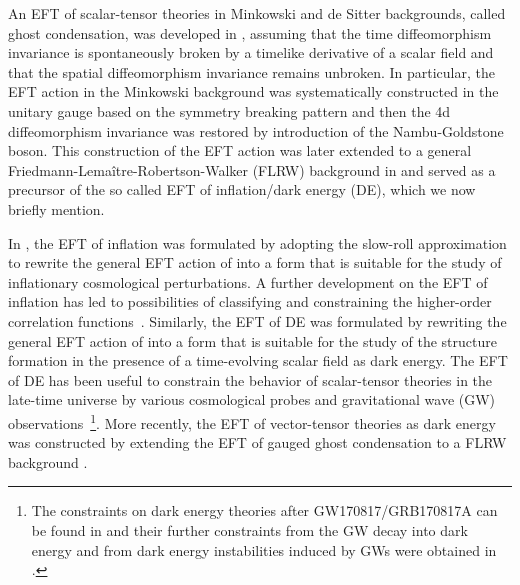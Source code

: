 \documentclass[a4paper,11pt]{article}
\numberwithin{equation}{section}
\begin{document}
An EFT of scalar-tensor theories in Minkowski and de Sitter backgrounds, called ghost condensation, was developed in \cite{ArkaniHamed:2003uy,Arkani-Hamed:2003juy}, assuming that the time diffeomorphism invariance is spontaneously broken by a timelike derivative of a scalar field and that the spatial diffeomorphism invariance remains unbroken. In particular, the EFT action in the Minkowski background was systematically constructed in the unitary gauge based on the symmetry breaking pattern and then the 4d diffeomorphism invariance was restored by introduction of the Nambu-Goldstone boson. This construction of the EFT action was later extended to a general Friedmann-Lema\^{i}tre-Robertson-Walker (FLRW) background in \cite{Creminelli:2006xe} and served as a precursor of the so called EFT of inflation/dark energy (DE), which we now briefly mention. 

In \cite{Cheung:2007st}, the EFT of inflation was formulated by adopting the slow-roll approximation to rewrite the general EFT action of \cite{Creminelli:2006xe} into a form that is suitable for the study of inflationary cosmological perturbations. 
A further development on the EFT of inflation has led to possibilities of classifying and constraining the higher-order correlation functions~\cite{Creminelli:2005hu,Senatore:2009gt}. Similarly, the EFT of DE \cite{Gubitosi:2012hu} was formulated by rewriting the general EFT action of \cite{Creminelli:2006xe} into a form that is suitable for the study of the structure formation in the presence of a time-evolving scalar field as dark energy. The EFT of DE has been useful to constrain the behavior of scalar-tensor theories in the late-time universe by various cosmological probes and gravitational wave (GW) observations~\footnote{The constraints on dark energy theories after GW170817/GRB170817A can be found in \cite{Creminelli:2017sry,Ezquiaga:2017ekz,Baker:2017hug} and their further constraints from the GW decay into dark energy and from dark energy instabilities induced by GWs were obtained in \cite{Creminelli:2018xsv,Creminelli:2019nok,Creminelli:2019kjy}.}. More recently, the EFT of vector-tensor theories as dark energy was constructed by extending the EFT of gauged ghost condensation \cite{Cheng:2006us} to a FLRW background \cite{Aoki:2021wew}.
\end{document}
